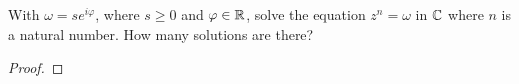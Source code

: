 \documentclass[../hw1]{subfiles}
\begin{document}
\begin{problem}
With $\omega = se^{i\varphi}$, where $s\ge 0$ and $\varphi \in \mathbb{R}$, solve the equation $z^n = \omega$ in $\mathbb{C}$ where $n$ is a natural number.
How many solutions are there?
\end{problem}
\begin{proof}

\end{proof}
\end{document}
